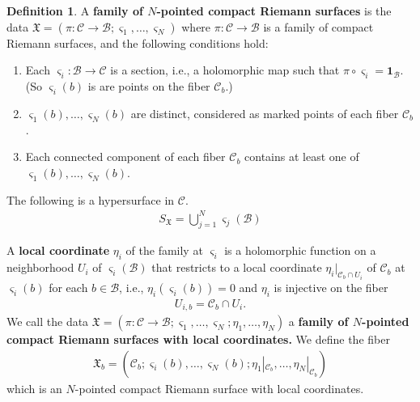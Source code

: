 \documentclass[12pt,a4paper,notitlepage]{article}
\theoremstyle{definition}
\newtheorem{df}{Definition}[section]
\theoremstyle{plain}
\newcommand{\fk}{\mathfrak}
\newcommand{\mc}{\mathcal}
\newcommand{\id}{\mathbf{1}}
\newcommand{\sgm}{\varsigma}
\newcommand{\SX}{{S_{\fk X}}}
\numberwithin{equation}{section}
\begin{document}
\begin{df}
A \textbf{family of $N$-pointed compact Riemann surfaces} is the data $\fk X=(\pi:\mc C\rightarrow\mc B;\sgm_1,\dots,\sgm_N)$ where $\pi:\mc C\rightarrow\mc B$ is a family of compact Riemann surfaces, and the following conditions hold:
\begin{enumerate}[label=(\alph*)]
\item Each $\sgm_i:\mc B\rightarrow\mc C$ is a section, i.e., a holomorphic map such that $\pi\circ\sgm_i=\id_{\mc B}$. (So $\sgm_i(b)$ is are points on the fiber $\mc C_b$.)
\item $\sgm_1(b),\dots,\sgm_N(b)$ are distinct, considered as marked points of each fiber $\mc C_b$.
\item Each connected component of each fiber $\mc C_b$ contains at least one of $\sgm_1(b),\dots,\sgm_N(b)$.
\end{enumerate}
The following is a hypersurface in $\mc C$. \index{SX@$\SX=\bigcup_{j=1}^N\sgm_j(\mc B)$}
\begin{align}\label{eq212}
\SX=\bigcup_{j=1}^N\sgm_j(\mc B)
\end{align}

A \textbf{local coordinate} $\eta_i$ of the family at $\sgm_i$ is a holomorphic function on a neighborhood $U_i$ of $\sgm_i(\mc B)$ that restricts to a local coordinate $\eta_i|_{\mc C_b\cap U_i}$ of $\mc C_b$ at $\sgm_i(b)$ for each $b\in\mc B$, i.e., $\eta_i(\sgm_i(b))=0$ and $\eta_i$ is injective on the fiber
\begin{align*}
U_{i,b}=\mc C_b\cap U_i.
\end{align*}
We call the data $\fk X=(\pi:\mc C\rightarrow\mc B;\sgm_1,\dots,\sgm_N;\eta_1,\dots,\eta_N)$ a \textbf{family of $N$-pointed compact Riemann surfaces with local coordinates.} We define the fiber \index{Xb@$\fk X_b$}
\begin{align}
\fk X_b=(\mc C_b;\sgm_i(b),\dots,\sgm_N(b);\eta_1|_{\mc C_b},\dots,\eta_N|_{\mc C_b})
\end{align}
which is an $N$-pointed compact Riemann surface with local coordinates. \hfill\qedsymbol
\end{df}



\subsection{}
\end{document}
